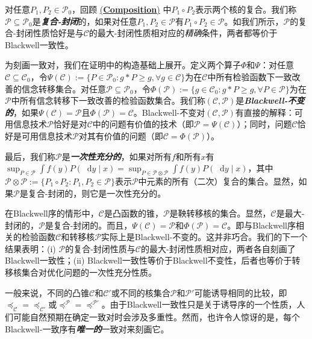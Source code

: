 \documentclass[12pt,letterpaper]{article}
\newenvironment{translation}{\color{blue}}{}
\theoremstyle{plain}
\theoremstyle{definition}
\theoremstyle{remark}
\newcommand{\Pc}{\mathcal{P}}
\newcommand{\C}{\mathcal{C}}
\renewcommand*\d{\mathop{}\!\mathrm{d}}
\theoremstyle{definition}
\DeclareRobustCommand{\weqref}[2]{
  \leavevmode\nobreak\hbox{\hyperlink{#2}{\textup{(#1)}}}
}
\begin{document}
\begin{translation}
对任意$P_1,P_2 \in \Pc_0$，回顾\weqref{\textbf{Composition}}{eq:composition}中$P_1 \circ P_2$表示两个核的复合。我们称$\Pc \subseteq \Pc_0$是\textit{\textbf{复合-封闭}}的，如果对任意$P_1,P_2 \in \Pc$有$P_1\circ P_2 \in \Pc$。如我们所示，$\Pc$的复合-封闭性质恰好是与$\C$的最大-封闭性质相对应的\textit{精确}条件，两者都等价于Blackwell一致性。

为刻画一致对，我们在证明中的构造基础上展开。定义两个算子$\Phi$和$\Psi$：对任意$\C \subseteq \C_0$，令$\Psi(\C):=\{P \in \Pc_0: g*P \geq g, \forall g \in \C\}$为在$\C$中所有检验函数下一致改善的信念转移集合。对任意$\Pc \subseteq \Pc_0$，令$\Phi(\Pc):=\{g \in \C_0: g*P \geq g, \forall P \in \Pc\}$为在$\Pc$中所有信念转移下一致改善的检验函数集合。我们称$(\C, \Pc)$是\textit{\textbf{Blackwell-不变的}}，如果$\Psi(\C)=\Pc$且$\Phi(\Pc)=\C$。Blackwell-不变对$(\C,\Pc)$有直接的解释：可用信息技术$\Pc$恰好是对$\C$中的问题有价值的技术（即$\Pc=\Psi(\C)$）；同时，问题$\C$恰好是可用信息技术$\Pc$对其有价值的问题（即$\C=\Phi(\Pc)$）。

最后，我们称$\mathcal{P}$是\textit{\textbf{一次性充分的}}，如果对所有$f$和所有$x$有$\sup_{P \in \mathcal{P}} \int f(y) P(\d y \mid x) = \sup_{P \in \mathcal{P} \otimes \mathcal{P}} \int f(y) P(\d y \mid x)$，其中$\Pc \otimes \Pc:=\{P_1 \circ P_2: P_1,P_2 \in \Pc\}$表示$\Pc$中元素的所有（二次）复合的集合。显然，如果$\mathcal{P}$是复合-封闭的，则它是一次性充分的。

在Blackwell序的情形中，$\C$是凸函数的锥，$\Pc$是鞅转移核的集合。显然，$\C$是最大-封闭的，$\Pc$是复合-封闭的。而且，$\Psi(\mathcal{C}) = \Pc$和$\Phi(\Pc) = \mathcal{C}$。即与Blackwell序相关的检验函数$\C$和转移核$\Pc$实际上是Blackwell-不变的。这并非巧合。我们的下一个结果表明：(i) $\Pc$的复合-封闭性质与$\C$的最大-封闭性质相对应，两者各自刻画了Blackwell一致性；(ii) Blackwell一致性等价于Blackwell不变性，后者也等价于转移核集合对优化问题的一次性充分性质。

一般来说，不同的凸锥$\C$和$\C'$或不同的核集合$\Pc$和$\Pc'$可能诱导相同的比较，即$\preceq_\C=\preceq_{\C'}$或$\preceq^{\Pc}=\preceq^{\Pc'}$。由于Blackwell一致性只是关于诱导序的一个性质，人们可能自然预期在确定一致对时会涉及多重性。然而，也许令人惊讶的是，每个Blackwell-一致序有\textit{\textbf{唯一的}}一致对来刻画它。
\end{translation}
\end{document}
